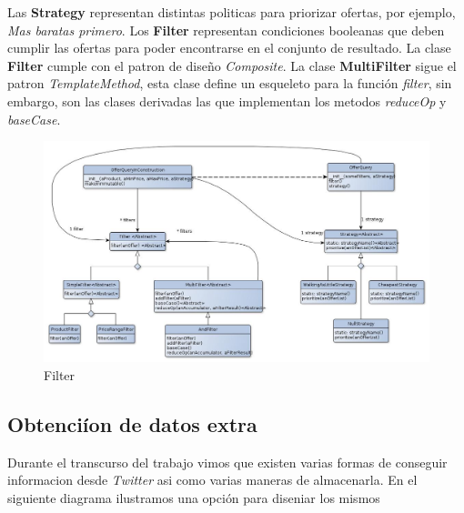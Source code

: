 \documentclass[10pt, a4paper]{article}
\begin{document}
\begin{landscape}
Las \textbf{Strategy} representan distintas politicas para priorizar ofertas, por ejemplo, \emph{Mas baratas primero}.
Los \textbf{Filter} representan condiciones booleanas que deben cumplir las ofertas para poder encontrarse en el conjunto de resultado. La clase \textbf{Filter} cumple con el patron de diseño \emph{Composite}. La clase \textbf{MultiFilter} sigue el patron \emph{TemplateMethod}, esta clase define un esqueleto para la función \emph{filter}, sin embargo, son las clases derivadas las que implementan los metodos \emph{reduceOp} y \emph{baseCase}.

\begin{figure}[H]
\centering
\includegraphics[scale=0.6]{graphics/filter_class.jpg}
\caption{Filter}
\end{figure}

\end{landscape}
\newpage
\subsection{Obtenci\'ion de datos extra}
Durante el transcurso del trabajo vimos que existen varias formas de conseguir informacion desde \emph{Twitter} asi como varias maneras de almacenarla. En el siguiente diagrama ilustramos una opci\'on para diseniar los mismos
\end{document}
